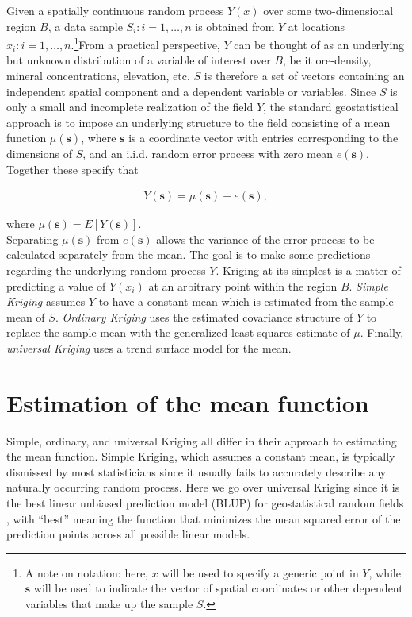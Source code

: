 \documentclass[12pt,twoside]{reedthesis}
\begin{document}
Given a spatially continuous random process $Y(x)$ over some two-dimensional region $B$, a data sample $S_i: i=1, \dots, n$ is obtained from $Y$ at locations $x_i: i=1, \dots, n$.\footnote{A note on notation: here, $x$ will be used to specify a generic point in $Y$, while $\mathbf{s}$ will be used to indicate the vector of spatial coordinates or other dependent variables that make up the sample $S$.}From a practical perspective, $Y$ can be thought of as an underlying but unknown distribution of a variable of interest over $B$, be it ore-density, mineral concentrations, elevation, etc. $S$ is therefore a set of vectors containing an independent spatial component and a dependent variable or variables. Since $S$ is only a small and incomplete realization of the field $Y$, the standard geostatistical approach is to impose an underlying structure to the field consisting of a mean function $\mu(\mathbf{s})$, where $\mathbf{s}$ is a coordinate vector with entries corresponding to the dimensions of $S$, and an i.i.d. random error process with zero mean $e(\mathbf{s})$. Together these specify that 

\begin{align*}
Y(\mathbf{s}) = \mu(\mathbf{s}) + e(\mathbf{s}),
\end{align*}

where $\mu(\mathbf{s}) = E[Y(\mathbf{s})]$.
  \\

Separating $\mu(\mathbf{s})$ from $e(\mathbf{s})$ allows the variance of the error process to be calculated separately from the mean. The goal is to make some predictions regarding the underlying random process $Y$. Kriging at its simplest is a matter of predicting a value of $Y(x_i)$ at an arbitrary point within the region $B$. \emph{Simple Kriging} assumes $Y$ to have a constant mean which is estimated from the sample mean of $S$. \emph{Ordinary Kriging} uses the estimated covariance structure of $Y$ to replace the sample mean with the generalized least squares estimate of $\mu$. Finally, \emph{universal Kriging} uses a trend surface model for the mean. 

\section{Estimation of the mean function}

Simple, ordinary, and universal Kriging all differ in their approach to estimating the mean function. Simple Kriging, which assumes a constant mean, is typically dismissed by most statisticians since it usually fails to accurately describe any naturally occurring random process. Here we go over universal Kriging since it is the best linear unbiased prediction model (BLUP) for geostatistical random fields \cite{gelfand:2010}, with ``best'' meaning the function that minimizes the mean squared error of the prediction points across all possible linear models. \\
\end{document}
